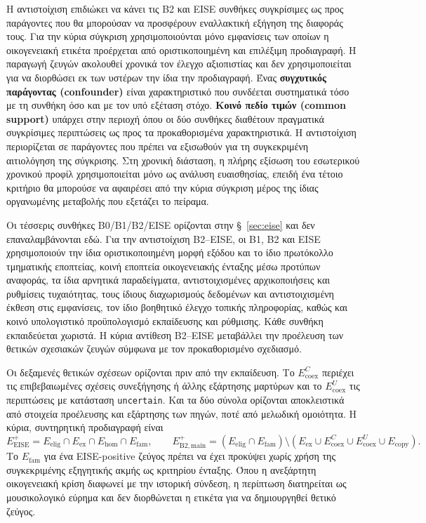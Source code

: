 \documentclass[11pt,a4paper]{article}
\begin{document}
Η αντιστοίχιση επιδιώκει να κάνει τις B2 και EISE συνθήκες συγκρίσιμες ως προς παράγοντες που θα μπορούσαν να προσφέρουν εναλλακτική εξήγηση της διαφοράς τους. Για την κύρια σύγκριση χρησιμοποιούνται μόνο εμφανίσεις των οποίων η οικογενειακή ετικέτα προέρχεται από οριστικοποιημένη και επιλέξιμη προδιαγραφή. Η παραγωγή ζευγών ακολουθεί χρονικά τον έλεγχο αξιοπιστίας και δεν χρησιμοποιείται για να διορθώσει εκ των υστέρων την ίδια την προδιαγραφή. Ένας \textbf{συγχυτικός παράγοντας (confounder)} είναι χαρακτηριστικό που συνδέεται συστηματικά τόσο με τη συνθήκη όσο και με τον υπό εξέταση στόχο. \textbf{Κοινό πεδίο τιμών (common support)} υπάρχει στην περιοχή όπου οι δύο συνθήκες διαθέτουν πραγματικά συγκρίσιμες περιπτώσεις ως προς τα προκαθορισμένα χαρακτηριστικά. Η αντιστοίχιση περιορίζεται σε παράγοντες που πρέπει να εξισωθούν για τη συγκεκριμένη αιτιολόγηση της σύγκρισης. Στη χρονική διάσταση, η πλήρης εξίσωση του εσωτερικού χρονικού προφίλ χρησιμοποιείται μόνο ως ανάλυση ευαισθησίας, επειδή ένα τέτοιο κριτήριο θα μπορούσε να αφαιρέσει από την κύρια σύγκριση μέρος της ίδιας οργανωμένης μεταβολής που εξετάζει το πείραμα.

Οι τέσσερις συνθήκες B0/B1/B2/EISE ορίζονται στην §~\ref{sec:eise} και δεν επαναλαμβάνονται εδώ. Για την αντιστοίχιση B2--EISE, οι B1, B2 και EISE χρησιμοποιούν την ίδια οριστικοποιημένη μορφή εξόδου και το ίδιο πρωτόκολλο τμηματικής εποπτείας, κοινή εποπτεία οικογενειακής ένταξης μέσω προτύπων αναφοράς, τα ίδια αρνητικά παραδείγματα, αντιστοιχισμένες αρχικοποιήσεις και ρυθμίσεις τυχαιότητας, τους ίδιους διαχωρισμούς δεδομένων και αντιστοιχισμένη έκθεση στις εμφανίσεις, τον ίδιο βοηθητικό έλεγχο τοπικής πληροφορίας, καθώς και κοινό υπολογιστικό προϋπολογισμό εκπαίδευσης και ρύθμισης. Κάθε συνθήκη εκπαιδεύεται χωριστά. Η κύρια αντίθεση B2--EISE μεταβάλλει την προέλευση των θετικών σχεσιακών ζευγών σύμφωνα με τον προκαθορισμένο σχεδιασμό.

Οι δεξαμενές θετικών σχέσεων ορίζονται πριν από την εκπαίδευση. Το $E_{\mathrm{coex}}^{C}$ περιέχει τις επιβεβαιωμένες σχέσεις συνεξήγησης ή άλλης εξάρτησης μαρτύρων και το $E_{\mathrm{coex}}^{U}$ τις περιπτώσεις με κατάσταση \texttt{uncertain}. Και τα δύο σύνολα ορίζονται αποκλειστικά από στοιχεία προέλευσης και εξάρτησης των πηγών, ποτέ από μελωδική ομοιότητα. Η κύρια, συντηρητική προδιαγραφή είναι
\[
E_{\mathrm{EISE}}^+=E_{\mathrm{elig}}\cap E_{\mathrm{ex}}\cap E_{\mathrm{hom}}\cap E_{\mathrm{fam}},
\qquad
E_{\mathrm{B2,main}}^+=(E_{\mathrm{elig}}\cap E_{\mathrm{fam}})\setminus(E_{\mathrm{ex}}\cup E_{\mathrm{coex}}^{C}\cup E_{\mathrm{coex}}^{U}\cup E_{\mathrm{copy}}).
\]
Το $E_{\mathrm{fam}}$ για ένα EISE-positive ζεύγος πρέπει να έχει προκύψει χωρίς χρήση της συγκεκριμένης εξηγητικής ακμής ως κριτηρίου ένταξης. Όπου η ανεξάρτητη οικογενειακή κρίση διαφωνεί με την ιστορική σύνδεση, η περίπτωση διατηρείται ως μουσικολογικό εύρημα και δεν διορθώνεται η ετικέτα για να δημιουργηθεί θετικό ζεύγος.
\end{document}
